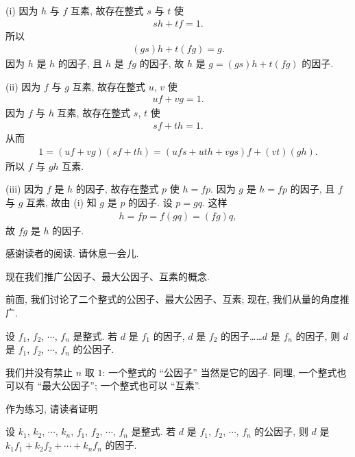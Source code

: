 \begin{pf}
    (i) 因为 $h$ 与 $f$ 互素, 故存在整式 $s$ 与 $t$ 使
    \begin{align*}
        sh + tf = 1.
    \end{align*}
    所以
    \begin{align*}
        (gs)h + t(fg) = g.
    \end{align*}
    因为 $h$ 是 $h$ 的因子, 且 $h$ 是 $fg$ 的因子, 故 $h$ 是 $g = (gs)h + t(fg)$ 的因子.

    (ii) 因为 $f$ 与 $g$ 互素, 故存在整式 $u$, $v$ 使
    \begin{align*}
        uf + vg = 1.
    \end{align*}
    因为 $f$ 与 $h$ 互素, 故存在整式 $s$, $t$ 使
    \begin{align*}
        sf + th = 1.
    \end{align*}
    从而
    \begin{align*}
        1 = (uf + vg)(sf + th) = (ufs + uth + vgs)f + (vt)(gh).
    \end{align*}
    所以 $f$ 与 $gh$ 互素.

    (iii) 因为 $f$ 是 $h$ 的因子, 故存在整式 $p$ 使 $h = fp$. 因为 $g$ 是 $h = fp$ 的因子, 且 $f$ 与 $g$ 互素, 故由 (i) 知 $g$ 是 $p$ 的因子. 设 $p = gq$. 这样
    \begin{align*}
        h = fp = f(gq) = (fg)q,
    \end{align*}
    故 $fg$ 是 $h$ 的因子.
\end{pf}

感谢读者的阅读. 请休息一会儿.

\myLine

现在我们推广公因子、最大公因子、互素的概念.

前面, 我们讨论了二个整式的公因子、最大公因子、互素; 现在, 我们从量的角度推广.

\begin{definition}
    设 $f_1$, $f_2$, $\cdots$, $f_n$ 是整式. 若 $d$ 是 $f_1$ 的因子, $d$ 是 $f_2$ 的因子……$d$ 是 $f_n$ 的因子, 则 $d$ 是 $f_1$, $f_2$, $\cdots$, $f_n$ 的公因子.
\end{definition}

\begin{remark}
    我们并没有禁止 $n$ 取 $1$: 一个整式的 ``公因子'' 当然是它的因子. 同理, 一个整式也可以有 ``最大公因子''; 一个整式也可以 ``互素''.
\end{remark}

作为练习, 请读者证明
\begin{proposition}
    设 $k_1$, $k_2$, $\cdots$, $k_n$, $f_1$, $f_2$, $\cdots$, $f_n$ 是整式. 若 $d$ 是 $f_1$, $f_2$, $\cdots$, $f_n$ 的公因子, 则 $d$ 是 $k_1 f_1 + k_2 f_2 + \cdots + k_n f_n$ 的因子.
\end{proposition}

